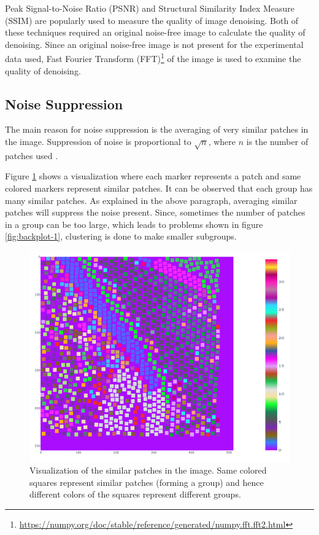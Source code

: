 \documentclass[fleqn,10pt]{wlscirep}
\begin{document}
Peak Signal-to-Noise Ratio (PSNR) and Structural Similarity Index Measure (SSIM) are popularly used to measure the quality of image denoising. Both of these techniques required an original noise-free image to calculate the quality of denoising. Since an original noise-free image is not present for the experimental data used, Fast Fourier Transform (FFT)\footnote{\url{https://numpy.org/doc/stable/reference/generated/numpy.fft.fft2.html}} of the image is used to examine the quality of denoising. 





\subsection*{Noise Suppression}

The main reason for noise suppression is the averaging of very similar patches in the image. Suppression of noise is proportional to $\sqrt{n}$, where $n$ is the number of patches used \cite{bcm_nlm}.

Figure \ref{fig:similar_patches} shows a visualization where each marker represents a patch and same colored markers represent similar patches. It can be observed that each group has many similar patches. As explained in the above paragraph, averaging similar patches will suppress the noise present. Since, sometimes the number of patches in a group can be too large, which leads to problems shown in figure \ref{fig:backplot-1}, clustering is done to make smaller subgroups.

\begin{figure}[H]
	\centering
	\includegraphics[scale=0.5]{./imgs/similar_patches.png}
	\caption[Visualization of the similar patches in the image]{Visualization of the similar patches in the image. Same colored squares represent similar patches (forming a group) and hence different colors of the squares represent different groups.}
	\label{fig:similar_patches}
\end{figure}
\end{document}
